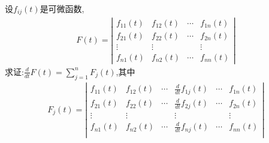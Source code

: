\documentclass[lang=cn,newtx,10pt,scheme=chinese]{elegantbook}
\begin{document}
\begin{proposition}[行列式的求导运算]\label{proposition:行列式的求导运算}
设\(f_{ij}(t)\)是可微函数,
\begin{align*}
F(t) = 
\left| \begin{matrix}
f_{11}(t) & f_{12}(t) & \cdots & f_{1n}(t) \\
f_{21}(t) & f_{22}(t) & \cdots & f_{2n}(t) \\
\vdots & \vdots &  & \vdots \\
f_{n1}(t) & f_{n2}(t) & \cdots & f_{nn}(t)
\end{matrix} \right| 
\nonumber
\end{align*}
求证:$\frac{d}{dt}F\left( t \right) =\sum_{j=1}^n{F_j\left( t \right)}$,其中
\begin{align*}
F_{j}(t) = 
\left| \begin{matrix}
f_{11}(t)&		f_{12}(t)&		\cdots&		\frac{d}{dt}f_{1j}(t)&		\cdots&		f_{1n}(t)\\
f_{21}(t)&		f_{22}(t)&		\cdots&		\frac{d}{dt}f_{2j}(t)&		\cdots&		f_{2n}(t)\\
\vdots&		\vdots&		&		\vdots&		&		\vdots\\
f_{n1}(t)&		f_{n2}(t)&		\cdots&		\frac{d}{dt}f_{nj}(t)&		\cdots&		f_{nn}(t)\\
\end{matrix} \right| 
\nonumber
\end{align*}
\end{proposition}
\end{document}

